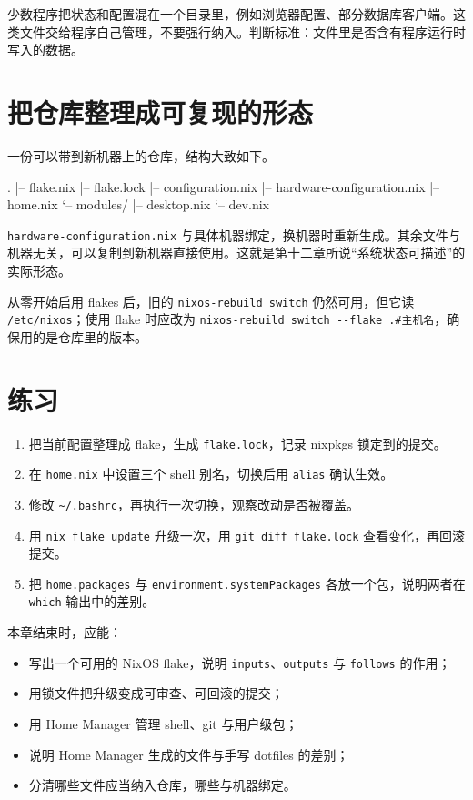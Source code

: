 \begin{notebox}
少数程序把状态和配置混在一个目录里，例如浏览器配置、部分数据库客户端。这类文件交给程序自己管理，不要强行纳入。判断标准：文件里是否含有程序运行时写入的数据。
\end{notebox}

\section{把仓库整理成可复现的形态}

一份可以带到新机器上的仓库，结构大致如下。

\begin{textcode}
.
|-- flake.nix
|-- flake.lock
|-- configuration.nix
|-- hardware-configuration.nix
|-- home.nix
`-- modules/
    |-- desktop.nix
    `-- dev.nix
\end{textcode}

\texttt{hardware-configuration.nix} 与具体机器绑定，换机器时重新生成。其余文件与机器无关，可以复制到新机器直接使用。这就是第十二章所说“系统状态可描述”的实际形态。

从零开始启用 flakes 后，旧的 \texttt{nixos-rebuild switch} 仍然可用，但它读 \texttt{/etc/nixos}；使用 flake 时应改为 \texttt{nixos-rebuild switch -{}-flake .\#主机名}，确保用的是仓库里的版本。

\section{练习}

\begin{enumerate}
  \item 把当前配置整理成 flake，生成 \texttt{flake.lock}，记录 nixpkgs 锁定到的提交。
  \item 在 \texttt{home.nix} 中设置三个 shell 别名，切换后用 \texttt{alias} 确认生效。
  \item 修改 \texttt{\textasciitilde/.bashrc}，再执行一次切换，观察改动是否被覆盖。
  \item 用 \texttt{nix flake update} 升级一次，用 \texttt{git diff flake.lock} 查看变化，再回滚提交。
  \item 把 \texttt{home.\allowbreak{}packages} 与 \texttt{environment.\allowbreak{}systemPackages} 各放一个包，说明两者在 \texttt{which} 输出中的差别。
\end{enumerate}

\begin{checkpoint}
本章结束时，应能：
\begin{itemize}
  \item 写出一个可用的 NixOS flake，说明 \texttt{inputs}、\texttt{outputs} 与 \texttt{follows} 的作用；
  \item 用锁文件把升级变成可审查、可回滚的提交；
  \item 用 Home Manager 管理 shell、git 与用户级包；
  \item 说明 Home Manager 生成的文件与手写 dotfiles 的差别；
  \item 分清哪些文件应当纳入仓库，哪些与机器绑定。
\end{itemize}
\end{checkpoint}
